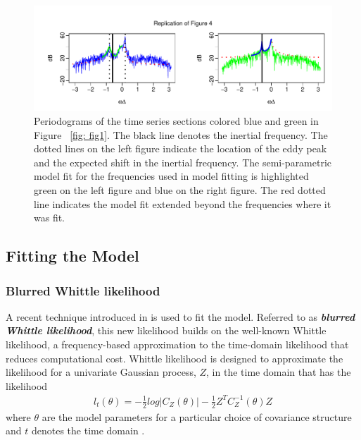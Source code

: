 \documentclass{stat572Style}
\begin{document}
\begin{figure}[h!]
  \centering
    \includegraphics[width=\textwidth]{ReplicatedFigures/fig4.pdf}
        \caption{Periodograms of the time series sections colored blue and green in Figure ~\ref{fig: fig1}. The black line denotes the inertial frequency.   The dotted lines on the left figure indicate the location of the eddy peak and the expected shift in the inertial frequency. The semi-parametric model fit for the frequencies used in model fitting is highlighted green on the left figure and blue on the right figure. The red dotted line indicates the model fit extended beyond the frequencies where it was fit. }
        	\label{fig: fig4}
\end{figure}


\subsection{Fitting the Model}
\subsubsection{Blurred Whittle likelihood}
\par A recent technique introduced in  \citet{Sykulski2013}  is used to fit the model.
 Referred to as \textbf{\it{blurred Whittle likelihood}}, this new likelihood builds on the well-known Whittle likelihood, a frequency-based approximation  to the time-domain likelihood that reduces computational cost. 
  Whittle likelihood is designed to approximate the likelihood for a univariate Gaussian process, $Z$,  in the time domain that has the likelihood
\begin{align*}
l_{t}(\theta) = - \frac{1}{2} log |C_{Z}(\theta) | - \frac{1}{2} Z^{T} C_{Z}^{-1}(\theta)Z
\end{align*}
where $\theta$ are the model parameters for a particular choice of covariance structure  and $t$ denotes the time domain  \citep{Sykulski2013}. 
\end{document}

